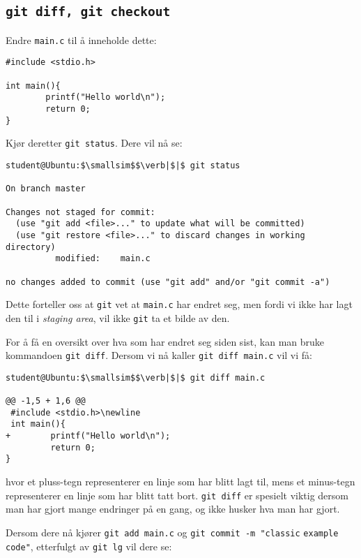 \begin{alphasection}
\subsection{\texttt{git diff, git checkout}}

Endre \verb|main.c| til å inneholde dette:

\begin{lstlisting}
#include <stdio.h>

int main(){
        printf("Hello world\n");
        return 0;
}
\end{lstlisting}

Kjør deretter \verb|git status|. Dere vil nå se:

\begin{lstlisting}[mathescape=true]
student@Ubuntu:$\smallsim$$\verb|$|$ git status

On branch master

Changes not staged for commit:
  (use "git add <file>..." to update what will be committed)
  (use "git restore <file>..." to discard changes in working directory)
	      modified:    main.c

no changes added to commit (use "git add" and/or "git commit -a")
\end{lstlisting}


Dette forteller oss at \verb|git| vet at \verb|main.c| har endret seg, men fordi vi ikke har lagt den til i \textit{staging area}, vil ikke \verb|git| ta et bilde av den.

For å få en oversikt over hva som har endret seg siden sist, kan man bruke kommandoen \verb|git diff|. Dersom vi nå kaller \verb|git diff main.c| vil vi få:

\begin{lstlisting}[mathescape=true]
student@Ubuntu:$\smallsim$$\verb|$|$ git diff main.c

@@ -1,5 + 1,6 @@
 #include <stdio.h>\newline
 int main(){
+        printf("Hello world\n");
         return 0;
}
\end{lstlisting}



hvor et pluss-tegn representerer en linje som har blitt lagt til, mens et minus-tegn representerer en linje som har blitt tatt bort. \verb|git diff| er spesielt viktig dersom man har gjort mange endringer på en gang, og ikke husker hva man har gjort.

Dersom dere nå kjører \verb|git add main.c| og \verb|git commit -m "classic|  \verb|example code"|, etterfulgt av \verb|git lg| vil dere se:


\end{alphasection}
